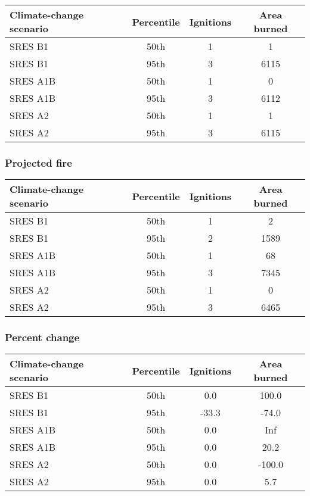 \documentclass{article}\usepackage[]{graphicx}\usepackage[]{color}
\newcommand{\headcol}{\rowcolor{tableheadcolor}}
\begin{document}
\begin{table}[ht]
\centering
\begin{tabular}{lccc}
  \headcol 
 \toprule
Climate-change scenario & Percentile & Ignitions & Area burned \\ 
  \midrule
SRES B1 & 50th & 1 & 1 \\ 
  SRES B1 & 95th & 3 & 6115 \\ 
  SRES A1B & 50th & 1 & 0 \\ 
  SRES A1B & 95th & 3 & 6112 \\ 
  SRES A2 & 50th & 1 & 1 \\ 
  SRES A2 & 95th & 3 & 6115 \\ 
   \bottomrule
\end{tabular}
\end{table}


\subsubsection{Projected fire}

\begin{table}[ht]
\centering
\begin{tabular}{lccc}
  \headcol 
 \toprule
Climate-change scenario & Percentile & Ignitions & Area burned \\ 
  \midrule
SRES B1 & 50th & 1 & 2 \\ 
  SRES B1 & 95th & 2 & 1589 \\ 
  SRES A1B & 50th & 1 & 68 \\ 
  SRES A1B & 95th & 3 & 7345 \\ 
  SRES A2 & 50th & 1 & 0 \\ 
  SRES A2 & 95th & 3 & 6465 \\ 
   \bottomrule
\end{tabular}
\end{table}


\subsubsection{Percent change}

\begin{table}[ht]
\centering
\begin{tabular}{lccc}
  \headcol 
 \toprule
Climate-change scenario & Percentile & Ignitions & Area burned \\ 
  \midrule
SRES B1 & 50th & 0.0 & 100.0 \\ 
  SRES B1 & 95th & -33.3 & -74.0 \\ 
  SRES A1B & 50th & 0.0 & Inf \\ 
  SRES A1B & 95th & 0.0 & 20.2 \\ 
  SRES A2 & 50th & 0.0 & -100.0 \\ 
  SRES A2 & 95th & 0.0 & 5.7 \\ 
   \bottomrule
\end{tabular}
\end{table}
\end{document}

